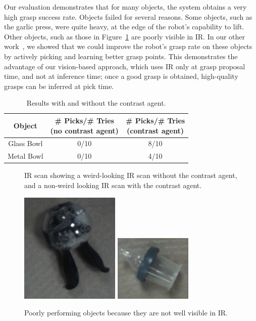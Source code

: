 \documentclass[graybox]{svmult}
\begin{document}
Our evaluation demonstrates that for many objects, the system obtains
a very high grasp success rate.  Objects failed for several reasons.
Some objects, such as the garlic press, were quite heavy, at the edge
of the robot's capability to lift.  Other objects, such as those in
Figure~\ref{fig:poor_ir} are poorly visible in IR.  In our other
work~\citep{oberlin15}, we showed that we could improve the robot's
grasp rate on these objects by actively picking and learning better
grasp points.  This demonstrates the advantage of our vision-based
approach, which uses IR only at grasp proposal time, and not at
inference time; once a good grasp is obtained, high-quality grasps can
be inferred at pick time.


\begin{table}
\centering
\begin{tabular}{ccc}
\toprule
Object		    & \parbox{0.3\linewidth}{\# Picks/\# Tries\\ (no contrast agent)} &\parbox{0.3\linewidth}{\# Picks/\# Tries\\ (contrast agent)}\\
\midrule
Glass Bowl          & 0/10  & 8/10 \\
Metal Bowl    	    & 0/10  & 4/10 \\
\bottomrule
\end{tabular}
\caption{Results with and without the contrast agent.}
\end{table}

\begin{figure}

\caption{IR scan showing a weird-looking IR scan without the contrast agent, and a non-weird looking IR scan with the contrast agent.}
\end{figure}

\begin{figure}
\includegraphics[width=0.3\linewidth]{figures/saltshaker.png}
\includegraphics[width=0.3\linewidth]{figures/bottletop.png}
\caption{Poorly performing objects because they are not well visible
  in IR.\label{fig:poor_ir}}
\end{figure}
\end{document}

